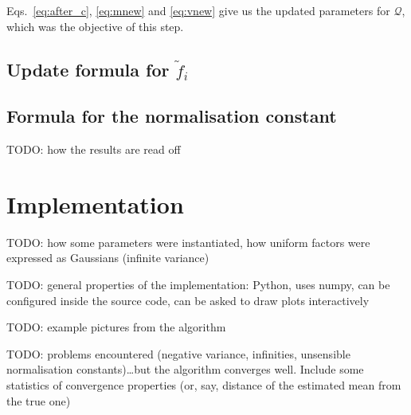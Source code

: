 \documentclass[11pt]{article}
\begin{document}
Eqs.~\eqref{eq:after_c}, \eqref{eq:mnew} and \eqref{eq:vnew} give us the 
updated parameters for $\mathcal{Q}$, which was the objective of this 
step.

\subsection*{Update formula for $\tilde{f}_i$}

\subsection*{Formula for the normalisation constant}

TODO: how the results are read off

\section{Implementation}
\label{sec:impl}

TODO: how some parameters were instantiated, how uniform factors were 
expressed as Gaussians (infinite variance)

TODO: general properties of the implementation: Python, uses numpy, can be 
configured inside the source code, can be asked to draw plots interactively

TODO: example pictures from the algorithm

TODO: problems encountered (negative variance, infinities, unsensible 
normalisation constants)\dots but the algorithm converges well. Include 
some statistics of convergence properties (or, say, distance of the 
estimated mean from the true one)



\end{document}
